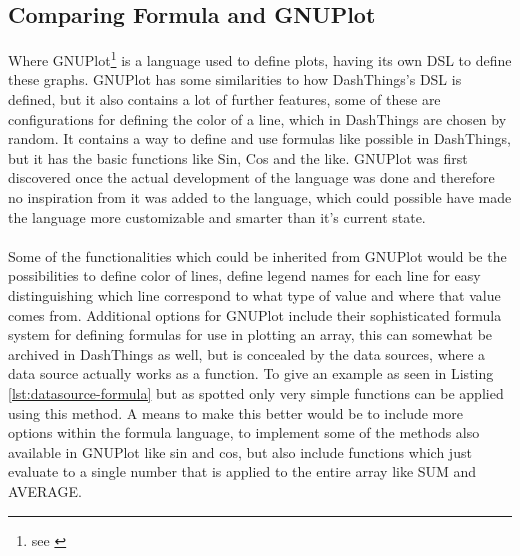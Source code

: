 \subsection{Comparing Formula and GNUPlot} 
\label{gnuplot}
Where GNUPlot\footnote{see \cite{GNUPlot}} is a language used to define
plots, having its own DSL to define these graphs. GNUPlot has some similarities to how DashThings's
DSL is defined, but it also contains a lot of further features, some of these are configurations
for defining the color of a line, which in DashThings are chosen by random. It contains a way
to define and use formulas like possible in DashThings, but it has the basic functions like
Sin, Cos and the like. GNUPlot was first discovered once the actual development of the language
was done and therefore no inspiration from it was added to the language, which could possible have
made the language more customizable and smarter than it's current state.
\\
\\
Some of the functionalities which could be inherited from GNUPlot would be the possibilities to
define color of lines, define legend names for each line for easy distinguishing which line
correspond to what type of value and where that value comes from. Additional options for GNUPlot
include their sophisticated formula system for defining formulas for use in plotting an array,
this can somewhat be archived in DashThings as well, but is concealed by the data sources, where
a data source actually works as a function. To give an example as seen in Listing
\ref{lst:datasource-formula} but as spotted only very simple functions can be applied using
this method. A means to make this better would be to include more options within the formula
language, to implement some of the methods also available in GNUPlot like sin and cos, but also
include functions which just evaluate to a single number that is applied to the entire array
like SUM and AVERAGE.

